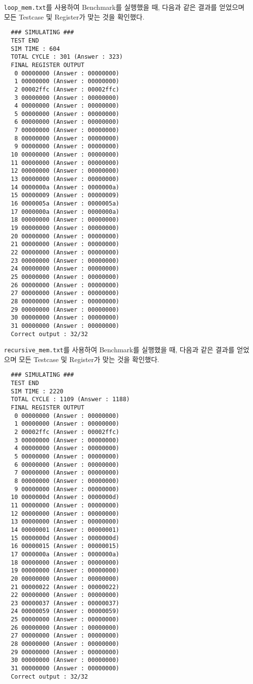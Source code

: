 \documentclass{scrartcl}
\begin{document}
\texttt{loop\_mem.txt}를 사용하여 Benchmark를 실행했을 때, 다음과 같은 결과를 얻었으며 모든 Testcase 및 Register가 맞는 것을 확인했다.
\begin{lstlisting}
  ### SIMULATING ###
  TEST END
  SIM TIME : 604
  TOTAL CYCLE : 301 (Answer : 323)
  FINAL REGISTER OUTPUT
   0 00000000 (Answer : 00000000)
   1 00000000 (Answer : 00000000)
   2 00002ffc (Answer : 00002ffc)
   3 00000000 (Answer : 00000000)
   4 00000000 (Answer : 00000000)
   5 00000000 (Answer : 00000000)
   6 00000000 (Answer : 00000000)
   7 00000000 (Answer : 00000000)
   8 00000000 (Answer : 00000000)
   9 00000000 (Answer : 00000000)
  10 00000000 (Answer : 00000000)
  11 00000000 (Answer : 00000000)
  12 00000000 (Answer : 00000000)
  13 00000000 (Answer : 00000000)
  14 0000000a (Answer : 0000000a)
  15 00000009 (Answer : 00000009)
  16 0000005a (Answer : 0000005a)
  17 0000000a (Answer : 0000000a)
  18 00000000 (Answer : 00000000)
  19 00000000 (Answer : 00000000)
  20 00000000 (Answer : 00000000)
  21 00000000 (Answer : 00000000)
  22 00000000 (Answer : 00000000)
  23 00000000 (Answer : 00000000)
  24 00000000 (Answer : 00000000)
  25 00000000 (Answer : 00000000)
  26 00000000 (Answer : 00000000)
  27 00000000 (Answer : 00000000)
  28 00000000 (Answer : 00000000)
  29 00000000 (Answer : 00000000)
  30 00000000 (Answer : 00000000)
  31 00000000 (Answer : 00000000)
  Correct output : 32/32
\end{lstlisting}

\texttt{recursive\_mem.txt}를 사용하여 Benchmark를 실행했을 때, 다음과 같은 결과를 얻었으며 모든 Testcase 및 Register가 맞는 것을 확인했다.
\begin{lstlisting}
  ### SIMULATING ###
  TEST END
  SIM TIME : 2220
  TOTAL CYCLE : 1109 (Answer : 1188)
  FINAL REGISTER OUTPUT
   0 00000000 (Answer : 00000000)
   1 00000000 (Answer : 00000000)
   2 00002ffc (Answer : 00002ffc)
   3 00000000 (Answer : 00000000)
   4 00000000 (Answer : 00000000)
   5 00000000 (Answer : 00000000)
   6 00000000 (Answer : 00000000)
   7 00000000 (Answer : 00000000)
   8 00000000 (Answer : 00000000)
   9 00000000 (Answer : 00000000)
  10 0000000d (Answer : 0000000d)
  11 00000000 (Answer : 00000000)
  12 00000000 (Answer : 00000000)
  13 00000000 (Answer : 00000000)
  14 00000001 (Answer : 00000001)
  15 0000000d (Answer : 0000000d)
  16 00000015 (Answer : 00000015)
  17 0000000a (Answer : 0000000a)
  18 00000000 (Answer : 00000000)
  19 00000000 (Answer : 00000000)
  20 00000000 (Answer : 00000000)
  21 00000022 (Answer : 00000022)
  22 00000000 (Answer : 00000000)
  23 00000037 (Answer : 00000037)
  24 00000059 (Answer : 00000059)
  25 00000000 (Answer : 00000000)
  26 00000000 (Answer : 00000000)
  27 00000000 (Answer : 00000000)
  28 00000000 (Answer : 00000000)
  29 00000000 (Answer : 00000000)
  30 00000000 (Answer : 00000000)
  31 00000000 (Answer : 00000000)
  Correct output : 32/32
\end{lstlisting}
\end{document}
